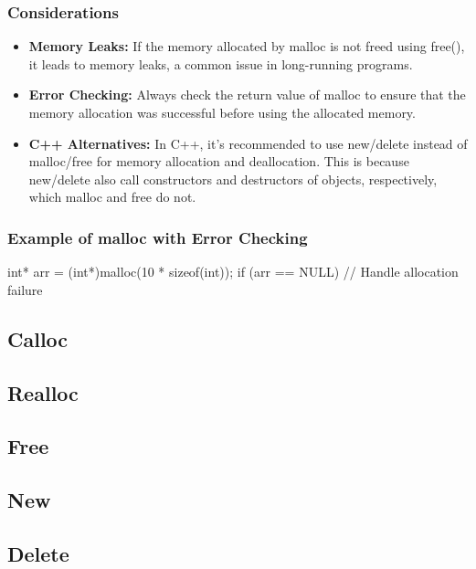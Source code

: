 \documentclass{report}
\begin{document}
    \subsubsection{Considerations}
    \begin{itemize}
        \item \textbf{Memory Leaks:} If the memory allocated by malloc is not freed using free(), it leads to memory leaks, a common issue in long-running programs.
        \item \textbf{Error Checking:} Always check the return value of malloc to ensure that the memory allocation was successful before using the allocated memory.
        \item \textbf{C++ Alternatives:} In C++, it's recommended to use new/delete instead of malloc/free for memory allocation and deallocation. This is because new/delete also call constructors and destructors of objects, respectively, which malloc and free do not.
    \end{itemize}
    \bigbreak \noindent 
    \subsubsection{Example of malloc with Error Checking}
    \bigbreak \noindent 
    \begin{cppcode}
    int* arr = (int*)malloc(10 * sizeof(int));
    if (arr == NULL) {
        // Handle allocation failure
    }
    \end{cppcode}


    \bigbreak \noindent 
    \subsection{Calloc}

    \bigbreak \noindent 
    \subsection{Realloc}

    \bigbreak \noindent 
    \subsection{Free}

    \bigbreak \noindent 
    \subsection{New}

    \bigbreak \noindent 
    \subsection{Delete}
\end{document}
